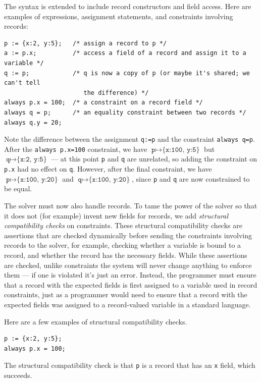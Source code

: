 \documentclass{article}
\begin{document}
The syntax is extended to include record constructors and field
access.  Here are examples of expressions, assignment statements, and
constraints involving records:

\begin{verbatim}
p := {x:2, y:5};   /* assign a record to p */
a := p.x;          /* access a field of a record and assign it to a variable */
q := p;            /* q is now a copy of p (or maybe it's shared; we can't tell
                      the difference) */
always p.x = 100;  /* a constraint on a record field */
always q = p;      /* an equality constraint between two records */
always q.y = 20;
\end{verbatim}

Note the difference between the assignment \verb|q:=p| and the
constraint \verb|always q=p|.  After the \verb|always p.x=100|
constraint, we have $\texttt{p} \mapsto \texttt{\{x:100, y:5\}}$ but
$\texttt{q} \mapsto \texttt{\{x:2, y:5\}}$ --- at this point \verb|p|
and \verb|q| are unrelated, so adding the constraint on \verb|p.x| had no
effect on \verb|q|.  However, after the final constraint, we have
$\texttt{p} \mapsto \texttt{\{x:100, y:20\}}$ and
$\texttt{q} \mapsto \texttt{\{x:100, y:20\}}$, since \verb|p| and
\verb|q| are now constrained to be equal.

The solver must now also handle records.  To tame the power of the
solver so that it does not (for example) invent new fields for
records, we add \emph{structural compatibility checks} on constraints.
These structural compatibility checks are assertions that are checked
dynamically before sending the constraints involving records to the
solver, for example, checking whether a variable is bound to a record,
and whether the record has the necessary fields.  While these
assertions are checked, unlike constraints the system will
never change anything to enforce them --- if one is violated it's just
an error.  Instead, the programmer must ensure that a record with the
expected fields is first assigned to a variable used in record
constraints, just as a programmer would need to ensure that a record
with the expected fields was assigned to a record-valued variable in a
standard language.

Here are a few examples of structural compatibility checks.

\begin{verbatim}
p := {x:2, y:5};
always p.x = 100;
\end{verbatim}
The structural compatibility check is that \verb|p| is a record that
has an \verb|x| field, which succeeds.
\end{document}
